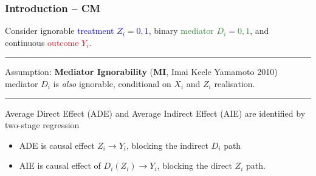 \documentclass[dvipsnames]{beamer} %
\renewcommand{\vec}[1]{\boldsymbol{\mathit{#1}}}                           %
\newcommand{\E}[2][]{\mathbb{E}_{#1} \left[ #2 \right]}                    %
\newcommand{\eqhighlight}[2]{\colorbox{#1!50}{$\displaystyle#2$}}
\begin{document}
\begin{frame}
    \frametitle{Introduction -- CM}
    Consider ignorable \textcolor{blue}{treatment $Z_i = 0, 1$},
    binary \textcolor{ForestGreen}{mediator $D_i = 0, 1$},
    and continuous \textcolor{red}{outcome $Y_i$}.
    \vskip-0.5cm
    \begin{figure}
        \centering
        \singlespacing
    \end{figure}
    
    \vskip0.5cm
    
    \par\noindent\rule{\textwidth}{0.4pt}
    
    \textcolor{gray!25}{
    Assumption:
    \textbf{Mediator Ignorability} (\textbf{MI}, Imai Keele Yamamoto 2010)
    \vskip0.125cm
    mediator $D_i$ is \textit{also} ignorable, conditional on $\vec X_i$ and $Z_i$ realisation.}
    
    \par\noindent\rule{\textwidth}{0.4pt}
    \textcolor{gray!25}{
    Average Direct Effect (ADE) and Average Indirect Effect (AIE) are identified by two-stage regression}
    \begin{itemize}
        \item \textcolor{gray!25}{ADE is causal effect $Z_i \to Y_i$, blocking the indirect $D_i$ path}
        \item \textcolor{gray!25}{AIE is causal effect of $D_i(Z_i) \to Y_i$, blocking the direct $Z_i$ path.}
    \end{itemize}
\end{frame}
\end{document}
